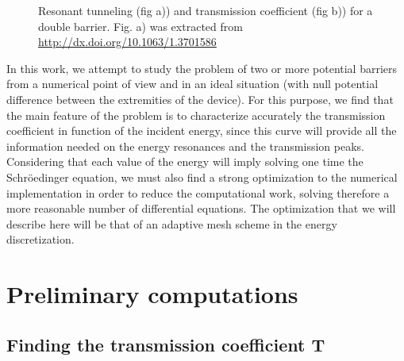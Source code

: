 \documentclass[12pt,a4paper,onecolumn]{article}
\theoremstyle{definition}
\theoremstyle{plain}
\begin{document}
\begin{figure}[h!]
\centering
	\caption{Resonant tunneling (fig a)) and transmission coefficient (fig b)) for a double barrier. Fig. a) was extracted from {\url{http://dx.doi.org/10.1063/1.3701586}}} 
	\label{fig:2barriers_problem}
\end{figure}

In this work, we attempt to study the problem of two or more potential barriers from a numerical point of view and in an ideal situation (with null potential difference between the extremities of the device). For this purpose, we find that the main feature of the problem is to characterize accurately the transmission coefficient in function of the incident energy, since this curve will provide all the information needed on the energy resonances and the transmission peaks. Considering that each value of the energy will imply solving one time the Schröedinger equation, we must also find a strong optimization to the numerical implementation in order to reduce the computational work, solving therefore a more reasonable number of differential equations. The optimization that we will describe here will be that of an adaptive mesh scheme in the energy discretization.

\section{Preliminary computations}
\subsection{Finding the transmission coefficient \textbf{T}}
\end{document}
